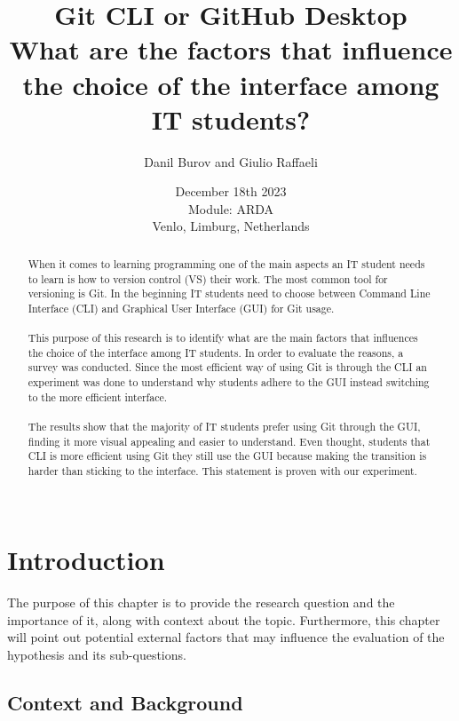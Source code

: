 \documentclass[]{report}
\title{Git CLI or GitHub Desktop \\ What are the factors that influence the choice of the interface among IT students?}
\author{Danil Burov and Giulio Raffaeli}
\date{December 18th 2023\\Module: ARDA \\Venlo, Limburg, Netherlands}
\begin{document}
	
	\maketitle
	
	\begin{abstract}
		When it comes to learning programming one of the main aspects an IT student needs to learn is how to version control (VS) their work. The most common tool for versioning is Git. In the beginning IT students need to choose between Command Line Interface (CLI) and Graphical User Interface (GUI) for Git usage. \\\\
		
		This purpose of this research is to identify what are the main factors that influences the choice of the interface among IT students. In order to evaluate the reasons, a survey was conducted. Since the most efficient way of using Git is through the CLI an experiment was done to understand why students adhere to the GUI instead switching to the more efficient interface.\\\\
		The results show that the majority of IT students prefer using Git through the GUI, finding it more visual appealing and easier to understand. Even thought, students that CLI is more efficient using Git they still use the GUI because making the transition is harder than sticking to the interface. This statement is proven with our experiment.\\\\
		
	\end{abstract}
	\tableofcontents
	\setcounter{page}{3}
	\listoffigures %
	\pagebreak
	
	
	\section{Introduction}
	The purpose of this chapter is to provide the research question and the importance of it, along with context about the topic. Furthermore, this chapter will point out potential external factors that may influence the evaluation of the hypothesis and its sub-questions. \\
	\subsection{Context and Background}
	
\end{document}
